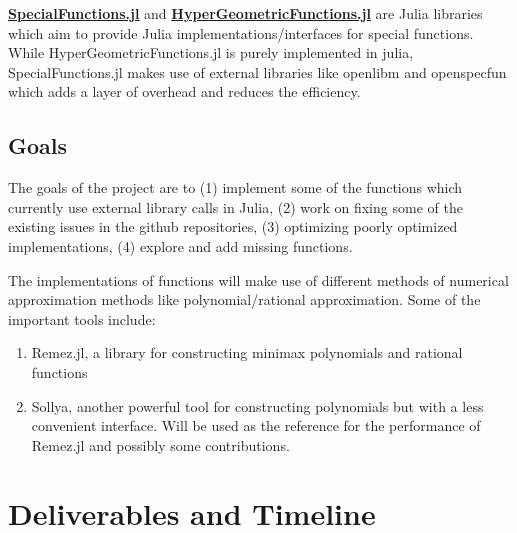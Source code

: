 \documentclass{article}
\theoremstyle{mytheoremstyle}
\theoremstyle{mytheoremstyle}
\theoremstyle{myproblemstyle}
\begin{document}
    \href{https://github.com/JuliaMath/SpecialFunctions.jl}{\textbf{SpecialFunctions.jl}} and \href{https://github.com/JuliaMath/HypergeometricFunctions.jl/issues}{\textbf{HyperGeometricFunctions.jl}} are Julia libraries which aim to provide Julia implementations/interfaces for special functions.
    While HyperGeometricFunctions.jl is purely implemented in julia, SpecialFunctions.jl makes use of external libraries like openlibm and openspecfun which adds a layer of overhead and reduces the efficiency.



    
    \subsection*{Goals}\label{sub:Goals} %
      The goals of the project are to (1) implement some of the functions which currently use external library calls in Julia, (2) work on fixing some of the existing issues in the github repositories, (3) optimizing poorly optimized implementations, (4) explore and add missing functions. 

      The implementations of functions will make use of different methods  of numerical approximation methods like polynomial/rational approximation. 
      Some of the important tools include: \begin{enumerate}
        \item Remez.jl, a library for constructing minimax polynomials and rational functions 
        \item Sollya, another powerful tool for constructing polynomials but with a less convenient interface. Will be used as the reference for the performance of Remez.jl and possibly some contributions.
      \end{enumerate}
    
  \section*{Deliverables and Timeline}\label{sec:Methods} %
\end{document}
